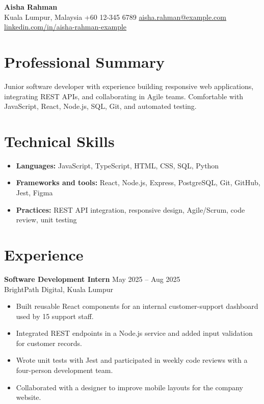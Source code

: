 \documentclass[11pt]{article}
\begin{document}
\begin{center}
  {\Large \textbf{Aisha Rahman}}\\
  Kuala Lumpur, Malaysia \textbar{} +60 12-345 6789 \textbar{} \href{mailto:aisha.rahman@example.com}{aisha.rahman@example.com}\\
  \href{https://www.linkedin.com/in/aisha-rahman-example}{linkedin.com/in/aisha-rahman-example}
\end{center}

\section*{Professional Summary}
Junior software developer with experience building responsive web applications, integrating REST APIs, and collaborating in Agile teams. Comfortable with JavaScript, React, Node.js, SQL, Git, and automated testing.

\section*{Technical Skills}
\begin{itemize}[leftmargin=*,nosep]
  \item \textbf{Languages:} JavaScript, TypeScript, HTML, CSS, SQL, Python
  \item \textbf{Frameworks and tools:} React, Node.js, Express, PostgreSQL, Git, GitHub, Jest, Figma
  \item \textbf{Practices:} REST API integration, responsive design, Agile/Scrum, code review, unit testing
\end{itemize}

\section*{Experience}
\textbf{Software Development Intern} \hfill May 2025 -- Aug 2025\\
BrightPath Digital, Kuala Lumpur
\begin{itemize}[leftmargin=*,nosep]
  \item Built reusable React components for an internal customer-support dashboard used by 15 support staff.
  \item Integrated REST endpoints in a Node.js service and added input validation for customer records.
  \item Wrote unit tests with Jest and participated in weekly code reviews with a four-person development team.
  \item Collaborated with a designer to improve mobile layouts for the company website.
\end{itemize}
\end{document}
